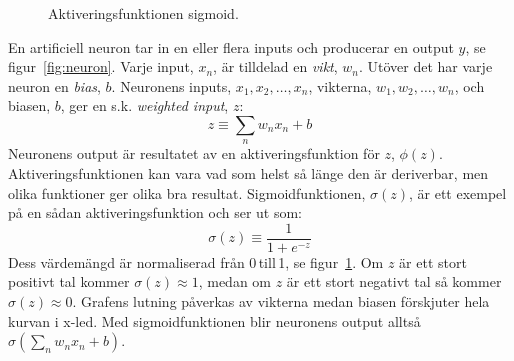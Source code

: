 \begin{figure}
	\centering
	\caption{Aktiveringsfunktionen sigmoid. \label{fig:sigmoid}}
\end{figure}

En artificiell neuron tar in en eller flera inputs och producerar en output $y$,
se figur~\ref{fig:neuron}.
Varje input, $x_n$, är tilldelad en \emph{vikt}, $w_n$.
Utöver det har varje neuron en \emph{bias}, $b$.
Neuronens inputs, $x_1,x_2, \dotsc, x_n$, vikterna, $w_1, w_2, \dotsc, w_n$,
och biasen, $b$, ger en s.k. \emph{weighted input}, $z$:
\begin{equation}
	z \equiv \sum_n w_n x_n + b
\end{equation}
Neuronens output är resultatet av en aktiveringsfunktion för $z$, $\phi(z)$.
Aktiveringsfunktionen kan vara vad som helst så länge den är deriverbar,
men olika funktioner ger olika bra resultat.
Sigmoidfunktionen, $\sigma(z)$, är ett exempel på en sådan aktiveringsfunktion
och ser ut som:
\begin{equation}
	\sigma(z) \equiv \frac{1}{1 + e^{-z}}
\end{equation}
Dess värdemängd är normaliserad från 0\,till\,1, se figur~\ref{fig:sigmoid}.
Om $z$ är ett stort positivt tal kommer $ \sigma(z) \approx 1 $,
medan om $z$ är ett stort negativt tal så kommer $ \sigma(z) \approx 0 $.
Grafens lutning påverkas av vikterna medan biasen förskjuter hela kurvan i x-led.
Med sigmoidfunktionen blir neuronens output alltså $ \sigma(\sum_n w_n x_n + b) $.
\autocite{nielsen15}

